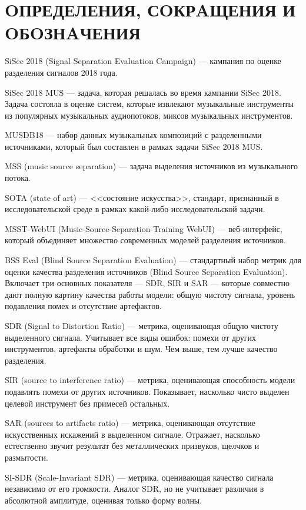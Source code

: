 \documentclass[14pt]{extarticle}
\begin{document}
\section*{OПРЕДЕЛЕНИЯ, СOКРAЩЕНИЯ И OБOЗНAЧЕНИЯ}
\par SiSec 2018 (Signal Separation Evaluation Campaign) --- кампания по оценке разделения сигналов 2018 года.
\par SiSec 2018 MUS --- задача, которая решалась во время кампании SiSec 2018. Задача состояла в оценке систем, 
которые извлекают музыкальные инструменты из популярных музыкальных аудиопотоков, миксов музыкальных инструментов.
\par MUSDB18 --- набор данных музыкальных композиций с разделенными источниками, который был составлен в рамках задачи SiSec 2018 MUS.
\par MSS (music source separation) --- задача выделения источников из музыкального потока.
\par SOTA (state of art) --- <<состояние искусства>>, стандарт, признанный в исследовательской среде в рамках какой-либо исследовательской задачи.
\par MSST-WebUI (Music-Source-Separation-Training WebUI) --- веб-интерфейс, который объединяет множество современных моделей разделения источников.
\par BSS Eval (Blind Source Separation Evaluation) --- стандартный набор метрик для оценки качества разделения источников (Blind Source Separation Evaluation). Включает три основных показателя — SDR, SIR и SAR — которые совместно дают полную картину качества работы модели: общую чистоту сигнала, уровень подавления помех и отсутствие артефактов.
\par SDR (Signal to Distortion Ratio) --- метрика, оценивающая общую чистоту выделенного сигнала. Учитывает все виды ошибок: помехи от других инструментов, артефакты обработки и шум. Чем выше, тем лучше качество разделения.
\par SIR (source to interference ratio) --- метрика, оценивающая способность модели подавлять помехи от других источников. Показывает, насколько чисто выделен целевой инструмент без примесей остальных.
\par SAR (sources to artifacts ratio) --- метрика, оценивающая отсутствие искусственных искажений в выделенном сигнале. Отражает, насколько естественно звучит результат без металлических призвуков, щелчков и размытости.
\par SI-SDR (Scale-Invariant SDR) --- метрика, оценивающая качество сигнала независимо от его громкости. Аналог SDR, но не учитывает различия в абсолютной амплитуде, оценивая только форму волны.
\end{document}
